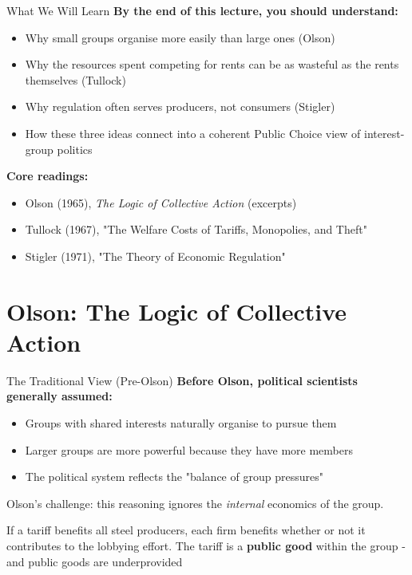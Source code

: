 \documentclass[10pt]{beamer}
\begin{document}
\begin{frame}{What We Will Learn}
\textbf{By the end of this lecture, you should understand:}

\begin{itemize}
\item Why \alert{small groups} organise more easily than large ones (Olson)
\item Why the resources spent competing for rents can be as wasteful as the rents themselves (Tullock)
\item Why regulation often serves \alert{producers}, not consumers (Stigler)
\item How these three ideas connect into a coherent Public Choice view of interest-group politics
\end{itemize}

\vspace{0.2cm}
\textbf{Core readings:}
\begin{itemize}
\item Olson (1965), \emph{The Logic of Collective Action} (excerpts)
\item Tullock (1967), "The Welfare Costs of Tariffs, Monopolies, and Theft"
\item Stigler (1971), "The Theory of Economic Regulation"
\end{itemize}
\end{frame}

\section{Olson: The Logic of Collective Action}

\begin{frame}{The Traditional View (Pre-Olson)}
\textbf{Before Olson, political scientists generally assumed:}

\begin{itemize}
\item Groups with shared interests naturally organise to pursue them
\item Larger groups are more powerful because they have more members
\item The political system reflects the "balance of group pressures"
\end{itemize}

\vspace{0.2cm}
\alert{Olson's challenge:} this reasoning ignores the \emph{internal} economics of the group.

\vspace{0.2cm}
If a tariff benefits all steel producers, each firm benefits whether or not it contributes to the lobbying effort.
The tariff is a \textbf{public good} within the group - and public goods are underprovided
\end{frame}
\end{document}
